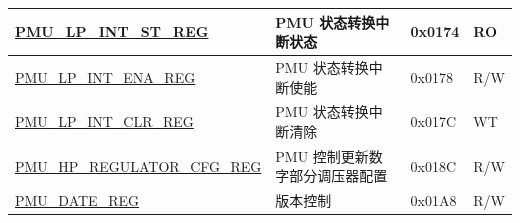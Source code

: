 \begin{longtable}{ | p{6.5cm} | p{8cm} | p{1.3cm} | p{1cm} | }
\hyperref[regdesc:PMULPINTSTREG]{PMU\_LP\_INT\_ST\_REG} & PMU 状态转换中断状态 & 0x0174 & RO \\ \hline
\hyperref[regdesc:PMULPINTENAREG]{PMU\_LP\_INT\_ENA\_REG} & PMU 状态转换中断使能 & 0x0178 & R/W \\ \hline
\hyperref[regdesc:PMULPINTCLRREG]{PMU\_LP\_INT\_CLR\_REG} & PMU 状态转换中断清除 & 0x017C & WT \\ \hline
\hyperref[regdesc:PMUHPREGULATORCFGREG]{PMU\_HP\_REGULATOR\_CFG\_REG} & PMU 控制更新数字部分调压器配置 & 0x018C & R/W \\ \hline
\hyperref[regdesc:PMUDATEREG]{PMU\_DATE\_REG} & 版本控制 & 0x01A8 & R/W \\ \hline
\end{longtable}